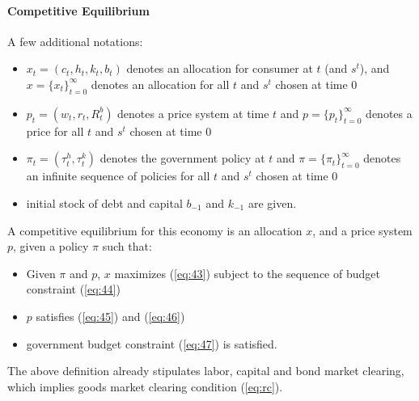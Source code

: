 \documentclass[12pt]{article}
\begin{document}
	\paragraph{Competitive Equilibrium \\ [6pt]}
	A few additional notations:
	\begin{itemize}
		\item $x_t = (c_t, h_t, k_t, b_t)$ denotes an allocation for consumer at $t$ (and $s^t$), and $x = \{x_t\}_{t=0}^\infty$ denotes an allocation for all $t$ and $s^t$ chosen at time 0
		\item $p_t = (w_t, r_t, R_t^b)$ denotes a price system at time $t$ and $p = \{p_t\}_{t=0}^\infty$ denotes a price for all $t$ and $s^t$ chosen at time 0
		\item $\pi_t = (\tau_t^h, \tau_t^k)$ denotes the government policy at $t$ and $\pi = \{\pi_t\}_{t=0}^\infty$ denotes an infinite sequence of policies for all $t$ and $s^t$ chosen at time 0
		\item initial stock of debt and capital $b_{-1}$ and $k_{-1}$ are given.
	\end{itemize}
	
	\begin{definition}
		A competitive equilibrium for this economy is an allocation $x$, and a price system $p$, given a policy $\pi$ such that:
		\begin{itemize}
			\item Given $\pi$ and $p$, $x$ maximizes (\ref{eq:43}) subject to the sequence of budget constraint (\ref{eq:44})
			\item $p$ satisfies (\ref{eq:45}) and (\ref{eq:46})
			\item government budget constraint (\ref{eq:47}) is satisfied.
		\end{itemize}
	The above definition already stipulates labor, capital and bond market clearing, which implies goods market clearing condition (\ref{eq:rc}).
	\end{definition}
	
\end{document}
